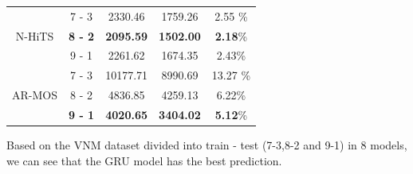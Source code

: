 \documentclass{ieeeojies}
\begin{document}
\begin{table}[h]
{\begin{tabular}{|c|c|c|c|c|}
    \hline
    \multirow{3}{*}{N-HiTS} & 7 - 3 & 2330.46 & 1759.26 & 2.55 \%\\
    \cline{2-5}
    & \textbf{8 - 2} & \textbf{2095.59 }& \textbf{1502.00} & \textbf{2.18}\% \\
    \cline{2-5}
    & 9 - 1 & 2261.62 & 1674.35 & 2.43\% \\
    \hline
    \multirow{3}{*}{AR-MOS} & 7 - 3 & 10177.71 & 8990.69 & 13.27 \%\\
    \cline{2-5}
    & 8 - 2 & 4836.85 & 4259.13 & 6.22\% \\
    \cline{2-5}
    &\textbf{ 9 - 1 }& \textbf{4020.65 }& \textbf{3404.02 }& \textbf{5.12}\% \\
    \hline
\end{tabular}%
}
\end{table}
Based on the VNM dataset divided into train - test (7-3,8-2 and 9-1) in 8 models, we can see that the GRU model has the best prediction.
\end{document}
